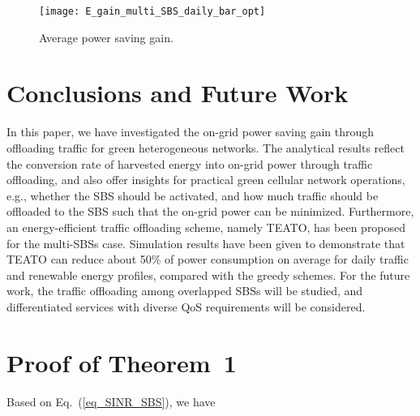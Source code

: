\documentclass[12pt, draftclsnofoot,onecolumn]{IEEEtran}
\begin{document}
\begin{figure}[t]
	\centering
	\texttt{[image: E\_gain\_multi\_SBS\_daily\_bar\_opt]}
	\caption{Average power saving gain.}\label{fig_network_gain_daily_bar}
\end{figure}
 \section{Conclusions and Future Work}
    \label{sec_conclusions}

    In this paper, we have investigated the on-grid power saving gain through offloading traffic for green
    heterogeneous networks.
    The analytical results reflect the conversion rate of harvested energy into on-grid power through traffic offloading, and also offer insights for practical green cellular  network operations, e.g., whether the SBS should be activated, and how much traffic should be offloaded to the SBS such that the on-grid power can be minimized.
    Furthermore, an energy-efficient traffic offloading scheme, namely TEATO, has been proposed for the multi-SBSs case.
    Simulation results have been given to demonstrate that TEATO can reduce about 50\% of power consumption on average for daily traffic and renewable energy profiles, compared with the greedy schemes.
    For the future work, the traffic offloading among overlapped SBSs will be studied, and differentiated services with diverse QoS requirements will be considered.


\appendices{}
   \section{Proof of Theorem~1}
    \label{appendix_SBS}

        Based on Eq.~(\ref{eq_SINR_SBS}), we have
        
\end{document}
